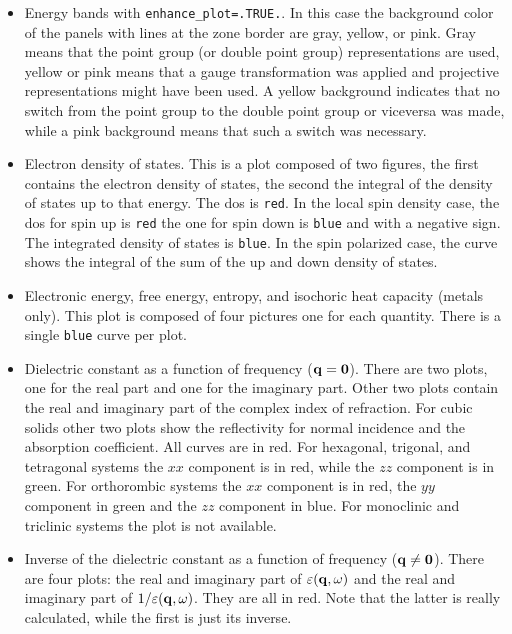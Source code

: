 \documentclass[12pt,a4paper,twoside]{report}
\begin{document}
\begin{itemize}
\item
Energy bands with \texttt{enhance\_plot=.TRUE.}. In this case 
the background color of the panels with lines at the zone border are 
gray, yellow, or pink. Gray means that the point group (or double point
group) representations are used, yellow or pink means that a gauge 
transformation was applied and projective representations might have been used. 
A yellow background indicates that no switch 
from the point group to the double point group or viceversa was made, 
while a pink background means that such a switch was necessary.
                              
\item
Electron density of states. This is a plot composed of two figures,
the first contains the electron density of states, the second the integral
of the density of states up to that energy. The dos is \texttt{red}.
In the local spin density case, the dos for spin up is \texttt{red} the
one for spin down is \texttt{blue} and with a negative sign.          
The integrated density of states is \texttt{blue}. In the spin polarized
case, the curve shows the integral of the sum of the up and down density 
of states.

\item
Electronic energy, free energy, entropy, and isochoric heat capacity 
(metals only). This plot is composed of four pictures one for each
quantity. There is a single \texttt{blue} curve per plot.      

\item
Dielectric constant as a function of frequency (${\bf q}={\bf 0}$). There are 
two plots, one for the real part and one for the imaginary part. 
Other two plots contain the real and imaginary part of the complex index
of refraction. For cubic solids other two plots show the reflectivity
for normal incidence and the absorption coefficient.
All curves are in red. For hexagonal, trigonal, and tetragonal 
systems the $xx$ component is in red, while the $zz$ component is in green. 
For orthorombic systems the $xx$ component is in red, the $yy$ component in 
green and the $zz$ component in blue. For monoclinic and triclinic
systems the plot is not available.

\item
Inverse of the dielectric constant as a function of frequency 
(${\bf q}\neq {\bf 0}$). There are four plots: the real and imaginary part of 
$\varepsilon({\bf q},\omega)$ and the real and imaginary part of 
$1/\varepsilon({\bf q},\omega)$. They are all in red. Note that the latter
is really calculated, while the first is just its inverse. 


\end{itemize}
\end{document}
